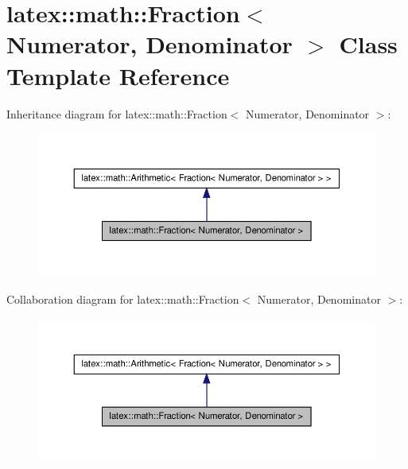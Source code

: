 \hypertarget{classlatex_1_1math_1_1Fraction}{\section{latex\-:\-:math\-:\-:\-Fraction$<$ \-Numerator, \-Denominator $>$ \-Class \-Template \-Reference}
\label{classlatex_1_1math_1_1Fraction}
}


\-Inheritance diagram for latex\-:\-:math\-:\-:\-Fraction$<$ \-Numerator, \-Denominator $>$\-:
\nopagebreak
\begin{figure}[H]
\begin{center}
\leavevmode
\includegraphics[width=350pt]{classlatex_1_1math_1_1Fraction__inherit__graph}
\end{center}
\end{figure}


\-Collaboration diagram for latex\-:\-:math\-:\-:\-Fraction$<$ \-Numerator, \-Denominator $>$\-:
\nopagebreak
\begin{figure}[H]
\begin{center}
\leavevmode
\includegraphics[width=350pt]{classlatex_1_1math_1_1Fraction__coll__graph}
\end{center}
\end{figure}
